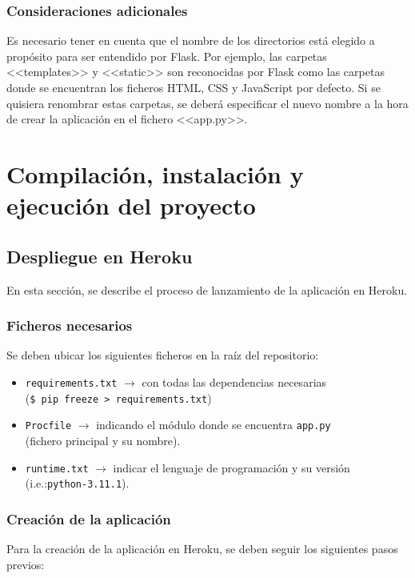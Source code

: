 \subsubsection{Consideraciones adicionales}
Es necesario tener en cuenta que el nombre de los directorios está elegido a propósito para ser entendido por Flask. Por ejemplo, las carpetas <<templates>> y <<static>> son reconocidas por Flask como las carpetas donde se encuentran los ficheros HTML, CSS y JavaScript por defecto. Si se quisiera renombrar estas carpetas, se deberá especificar el nuevo nombre a la hora de crear la aplicación en el fichero <<app.py>>.

\section{Compilación, instalación y ejecución del proyecto}

\subsection{Despliegue en Heroku}
En esta sección, se describe el proceso de lanzamiento de la aplicación en Heroku.


\subsubsection{Ficheros necesarios}
Se deben ubicar los siguientes ficheros en la raíz del repositorio:
\begin{itemize}
    \item \texttt{requirements.txt} $\to$ con todas las dependencias necesarias \\
    (\texttt{\$ pip freeze > requirements.txt})
    \item \texttt{Procfile} $\to$ indicando el módulo donde se encuentra \texttt{app.py} \\
    (fichero principal y su nombre).
    \item \texttt{runtime.txt} $\to$ indicar el lenguaje de programación y su versión (i.e.:\texttt{python-3.11.1}).
\end{itemize}

\subsubsection{Creación de la aplicación}
Para la creación de la aplicación en Heroku, se deben seguir los siguientes pasos previos:

